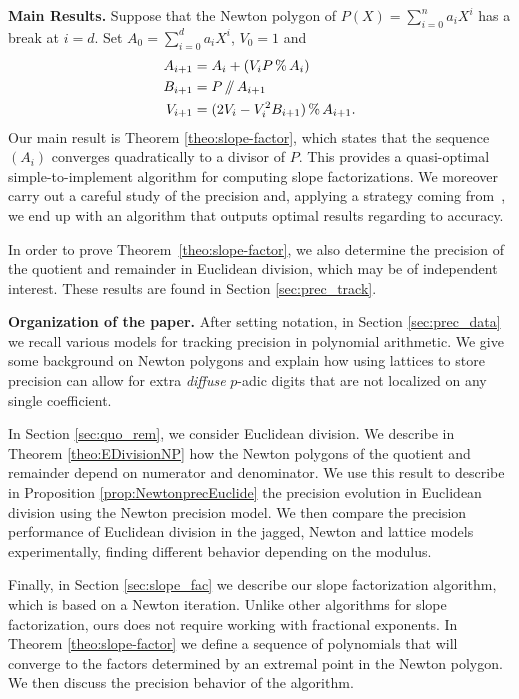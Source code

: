\documentclass{sig-alternate-05-2015}
\renewcommand{\mod}{\,\%\,}
\renewcommand{\div}{\,/\hspace{-0.3em}/\,}
\def\todo#1{\ \!\!{\color{red} #1}}
\begin{document}
\medskip

\noindent
{\bf Main Results.}
%
Suppose that the Newton polygon of $P(X) = \sum_{i=0}^n a_i X^i$
has a break at $i=d$.  Set $A_0 = \sum_{i=0}^d a_i X^i$, $V_0 = 1$ and
\begin{align*}
A_{i+1} &= A_i + (V_i P \mod A_i) \\
B_{i+1} &= P \div A_{i+1} \\
V_{i+1} &= (2V_i - V_i^2B_{i+1}) \mod A_{i+1}.
\end{align*}
Our main result is Theorem \ref{theo:slope-factor},
which states that the sequence $(A_i)$ converges quadratically
to a divisor of $P$. This provides a quasi-optimal simple-to-implement 
algorithm for computing slope factorizations.
We moreover carry out a careful study of the precision and, applying
a strategy coming from~\cite{caruso-roe-vaccon:14a}, we end up with
an algorithm that outputs optimal results regarding to accuracy.

In order to prove Theorem~\ref{theo:slope-factor}, we also determine
the precision of the quotient and remainder in Euclidean division,
which may be of independent interest.  These results are found in
Section \ref{sec:prec_track}.

\medskip

\noindent
{\bf Organization of the paper.}
%
After setting notation, in
Section \ref{sec:prec_data} we recall various models for tracking
precision in polynomial arithmetic.  We give some background
on Newton polygons and explain how using lattices to store
precision can allow for extra \emph{diffuse} $p$-adic digits that
are not localized on any single coefficient.

In Section \ref{sec:quo_rem}, we consider Euclidean division.
We describe in Theorem \ref{theo:EDivisionNP}
how the Newton polygons of the quotient and remainder
depend on numerator and denominator.  We use this
result to describe in Proposition \ref{prop:NewtonprecEuclide}
the precision evolution in Euclidean division using
the Newton precision model.  We then compare the
precision performance of Euclidean division in the
jagged, Newton and lattice models experimentally,
finding different behavior depending on the modulus.

Finally, in Section \ref{sec:slope_fac} we describe
our slope factorization algorithm, which is based on
a Newton iteration.  Unlike other algorithms for
slope factorization, ours does not require working
with fractional exponents. %
In Theorem \ref{theo:slope-factor} we define a sequence
of polynomials that will converge to the factors
determined by an extremal point in the Newton
polygon.  We then discuss the precision behavior
of the algorithm.
\end{document}
